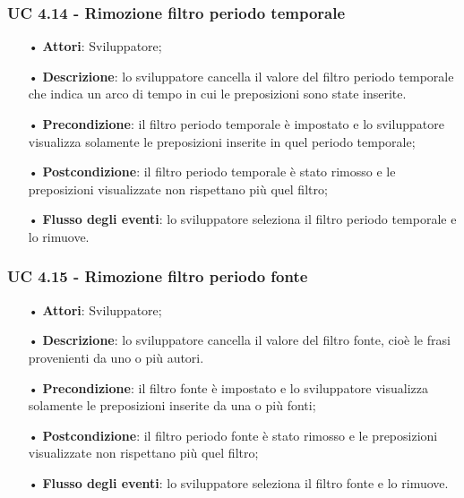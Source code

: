 \subsubsection{UC 4.14 - Rimozione filtro periodo temporale}
\begin{itemize}
	\item[•]\textbf{Attori}: Sviluppatore;
	\item[•]\textbf{Descrizione}: lo sviluppatore cancella il valore del filtro periodo temporale che indica un arco di tempo in cui le preposizioni sono state inserite.
	\item[•]\textbf{Precondizione}: il filtro periodo temporale è impostato e lo sviluppatore visualizza solamente le preposizioni inserite in quel periodo temporale;
	\item[•]\textbf{Postcondizione}: il filtro periodo temporale è stato rimosso e le preposizioni visualizzate non rispettano più quel filtro;
	\item[•]\textbf{Flusso degli eventi}: lo sviluppatore seleziona il filtro periodo temporale e lo rimuove.
\end{itemize}

\subsubsection{UC 4.15 - Rimozione filtro periodo fonte}
\begin{itemize}
	\item[•]\textbf{Attori}: Sviluppatore;
	\item[•]\textbf{Descrizione}: lo sviluppatore cancella il valore del filtro fonte, cioè le frasi provenienti da uno o più autori.
	\item[•]\textbf{Precondizione}: il filtro fonte è impostato e lo sviluppatore visualizza solamente le preposizioni inserite da una o più fonti;
	\item[•]\textbf{Postcondizione}: il filtro periodo fonte è stato rimosso e le preposizioni visualizzate non rispettano più quel filtro;
	\item[•]\textbf{Flusso degli eventi}: lo sviluppatore seleziona il filtro fonte e lo rimuove.
\end{itemize}

